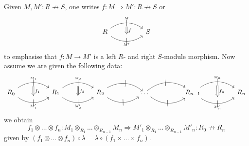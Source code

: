 \documentclass[8pt]{article}
\theoremstyle{definition}
\theoremstyle{definition}
\theoremstyle{definition}
\theoremstyle{definition}
\theoremstyle{definition}
\theoremstyle{definition}
\theoremstyle{definition}
\theoremstyle{definition}
\theoremstyle{definition}
\theoremstyle{definition}
\theoremstyle{definition}
\theoremstyle{definition}
\theoremstyle{definition}
\theoremstyle{definition}
\theoremstyle{question}
\begin{document}
Given $M, M' : R \not\to S$, one writes $f : M \Rightarrow M' : R \not\to S$ or
\[
  \begin{tikzcd}
     R \ar[rr, bend left=35, "{}^M", ""{name=M}, "|" marking] \ar[rr, bend right=35, "{}_{M'}"', ""{name=M'}, "|" marking] && S
     \arrow[from=M, to=M', Rightarrow, "f", shorten=2mm]
  \end{tikzcd}
\]
to emphasise that $f : M \to M'$ is a left $R$- and right $S$-module morphism. Now assume we are given
the following data:
\[
\begin{tikzcd}
  R_0 \ar[rr, bend left=35, "{}^{M_1}", ""{name=M1}, "|" marking] \ar[rr, bend right=35, "{}_{M_1'}"', ""{name=M1'}, "|" marking] && R_1 \ar[rr, bend left=35, "{}^{M_2}", ""{name=M2}, "|" marking] \ar[rr, bend right=35, "{}_{M_2'}"', ""{name=M2'}, "|" marking] && R_2 \ar[rr, bend left=35, "|" marking] \ar[rr, bend right=35, "|" marking] && \ldots \ar[rr, bend left=35, "|" marking] \ar[rr, bend right=35, "|" marking] && R_{n - 1} \ar[rr, bend left=35, "{}^{M_n}", ""{name=Mn}, "|" marking] \ar[rr, bend right=35, "{}_{M_n'}"', ""{name=Mn'}, "|" marking] && R_n
  \arrow[from=M1, to=M1', Rightarrow, "f_1", shorten=2mm]
  \arrow[from=M2, to=M2', Rightarrow, "f_2", shorten=2mm]
  \arrow[from=Mn, to=Mn', Rightarrow, "f_n", shorten=2mm]
\end{tikzcd}
\]
we obtain
\[ f_1 \otimes \ldots \otimes f_n : M_1 \otimes_{R_1} \ldots \otimes_{R_{n - 1}} M_n \Rightarrow M'_1 \otimes_{R_1} \ldots \otimes_{R_{n - 1}} M'_n : R_0 \not\to R_n 
\]
given by $(f_1 \otimes \ldots \otimes f_n) \circ \lambda = \lambda \circ (f_1 \times \ldots \times f_n)$.
\end{document}
